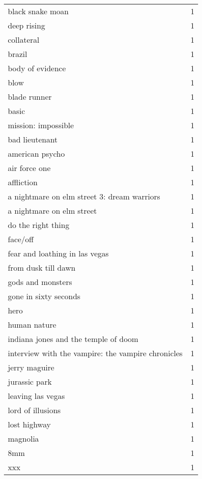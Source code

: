 \begin{tabular}{lr}
black snake moan & 1 \\
deep rising & 1 \\
collateral & 1 \\
brazil & 1 \\
body of evidence & 1 \\
blow & 1 \\
blade runner & 1 \\
basic & 1 \\
mission: impossible & 1 \\
bad lieutenant & 1 \\
american psycho & 1 \\
air force one & 1 \\
affliction & 1 \\
a nightmare on elm street 3: dream warriors & 1 \\
a nightmare on elm street & 1 \\
do the right thing & 1 \\
face/off & 1 \\
fear and loathing in las vegas & 1 \\
from dusk till dawn & 1 \\
gods and monsters & 1 \\
gone in sixty seconds & 1 \\
hero & 1 \\
human nature & 1 \\
indiana jones and the temple of doom & 1 \\
interview with the vampire: the vampire chronicles & 1 \\
jerry maguire & 1 \\
jurassic park & 1 \\
leaving las vegas & 1 \\
lord of illusions & 1 \\
lost highway & 1 \\
magnolia & 1 \\
8mm & 1 \\
xxx & 1 \\
\bottomrule
\end{tabular}
